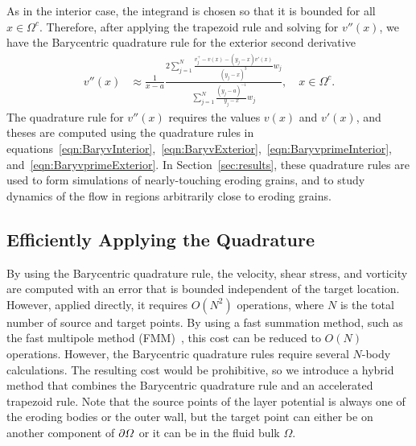\documentclass{jfm}
\begin{document}
As in the interior case, the integrand is chosen so that it is bounded
for all $x \in \Omega^c$.  Therefore, after applying the trapezoid rule
and solving for $v''(x)$, we have the Barycentric quadrature rule for
the exterior second derivative
\begin{align}
  v''(x) &\approx \frac{1}{x-a}\frac{2\sum\limits_{j=1}^N
    \frac{v^{+}_{j} - v(x) - (y_j-x)v'(x)}{(y_j-x)^3}w_j}
    {\sum\limits_{j=1}^N \frac{(y_j-a)^{-1}}{y_j-x}w_j}, 
    \quad x \in \Omega^c.
\end{align}
The quadrature rule for $v''(x)$ requires the values $v(x)$ and $v'(x)$,
and theses are computed using the quadrature rules in
equations~\eqref{eqn:BaryvInterior},~\eqref{eqn:BaryvExterior},~\eqref{eqn:BaryvprimeInterior},
and~\eqref{eqn:BaryvprimeExterior}. In Section~\ref{sec:results}, these
quadrature rules are used to form simulations of nearly-touching eroding
grains, and to study dynamics of the flow in regions arbitrarily close
to eroding grains.

\subsection{Efficiently Applying the Quadrature}
\label{sec:fmm}
By using the Barycentric quadrature rule, the velocity, shear stress,
and vorticity are computed with an error that is bounded independent of
the target location. However, applied directly, it requires
$O(N^2)$ operations, where $N$ is the total number of source
and target points.  By using a fast summation method, such as the fast
multipole method (FMM)~\citep{gre-rok1987}, this cost can be reduced to
$O(N)$ operations.  However, the Barycentric quadrature rules
require several $N$-body calculations.  The resulting cost would be
prohibitive, so we introduce a hybrid method that combines the
Barycentric quadrature rule and an accelerated trapezoid rule.  Note
that the source points of the layer potential is always one of the
eroding bodies or the outer wall, but the target point can either be on
another component of ${\partial}\varOmega$ or it can be in the fluid bulk
$\Omega$.
\end{document}
